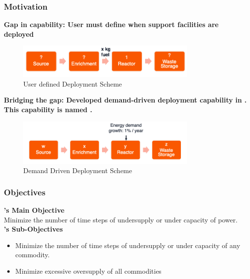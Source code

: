 \begin{frame}
\frametitle{Motivation}

\textbf{Gap in capability: User must define when support facilities are deployed}

\begin{figure}[htbp!]
\begin{center}
	\includegraphics[width=0.8\textwidth]{images/user-deploy}
\end{center}
\caption{User defined Deployment Scheme }
\end{figure}

\textbf{Bridging the gap: Developed demand-driven deployment capability in \Cyclus. This capability is named \deploy.}

\begin{figure}[htbp!]
\begin{center}
	\includegraphics[width=0.8\textwidth]{images/auto-deploy}
\end{center}
\caption{Demand Driven Deployment Scheme}
\end{figure}

\end{frame}

\begin{frame}
\frametitle{\deploy Objectives}
\textbf{\deploy's Main Objective}
\vspace{0.3em}
\\
Minimize the number of time steps of undersupply or under capacity 
of power.
\vspace{1em}
\\
\textbf{\deploy's Sub-Objectives}
\begin{itemize}
	\item Minimize the number of time steps of undersupply or under capacity 
	of any commodity.
	\item Minimize excessive oversupply of all commodities  
\end{itemize} 
\end{frame}

